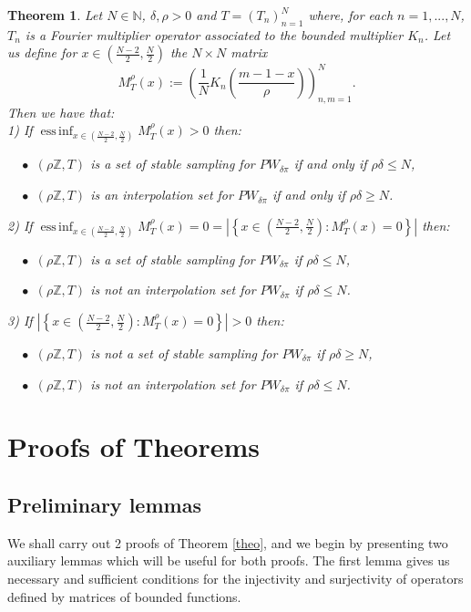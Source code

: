 \documentclass[reqno]{amsart}
\theoremstyle{plain}
\newtheorem{theorem}{Theorem}
\theoremstyle{definition}
\numberwithin{equation}{section}
\newcommand{\Z}{{\mathbb Z}}
\newcommand{\N}{{\mathbb N}}
\newcommand{\pa}[1]{\left(#1\right)}
\newcommand{\abs}[1]{\left\vert#1\right\vert}
\newcommand{\set}[2]{\left\{#1 :#2\right\}}
\DeclareMathOperator{\essinf}{ess\,inf}
\providecommand{\abs}[1]{ \lvert#1  \rvert}
\begin{document}
\begin{theorem} \label{theo2}
	Let $N\in\N$, $\delta,\rho>0$ and $T=\pa{T_n}_{n=1}^N$ where, for each $n=1,...,N$, $T_n$ is a Fourier multiplier operator associated to the bounded multiplier $K_n$. Let us define for $x\in\pa{\frac{N-2}{2},\frac{N}{2}}$ the $N\times N$ matrix
	$$M^\rho_T(x):=\pa{\frac{1}{N} K_n\pa{\frac{m-1-x}{\rho}}}_{n,m=1}^N.$$
	Then we have that: \\
	
	1) If $\essinf_{x\in\pa{\frac{N-2}{2},\frac{N}{2}}} M^\rho_T(x)>0$ then:
	
	$\quad \bullet$ $\pa{\rho\Z,T}$ is a set of stable sampling for $PW_{\delta\pi}$ if and only if $\rho\delta\leq N$,
	
	$\quad \bullet$ $\pa{\rho\Z,T}$ is an interpolation set for $PW_{\delta\pi}$ if and only if $\rho\delta\geq N$.
    	
	2) If $\essinf_{x\in\pa{\frac{N-2}{2},\frac{N}{2}}} M^\rho_T(x)=0=\abs{\set{x\in\pa{\frac{N-2}{2},\frac{N}{2}}}{M^\rho_T(x)=0}}$ then:

    $\quad \bullet$ $\pa{\rho\Z,T}$ is a set of stable sampling for $PW_{\delta\pi}$ if $\rho\delta\leq N$,
	
	$\quad \bullet$ $\pa{\rho\Z,T}$ is not an interpolation set for $PW_{\delta\pi}$ if $\rho\delta\leq N$. 
    
	3) If $\abs{\set{x\in\pa{\frac{N-2}{2},\frac{N}{2}}}{M^\rho_T(x)=0}}> 0$ then:

    $\quad \bullet$ $\pa{\rho\Z,T}$ is not a set of stable sampling for $PW_{\delta\pi}$ if $\rho\delta\geq N$, 
	
	$\quad \bullet$ $\pa{\rho\Z,T}$ is not an interpolation set for $PW_{\delta\pi}$ if $\rho\delta\leq N$. 
\end{theorem}


\section{Proofs of Theorems}

\subsection{Preliminary lemmas} We shall carry out 2 proofs of Theorem \ref{theo}, and we begin by presenting two auxiliary lemmas which will be useful for both proofs. The first lemma gives us necessary and sufficient conditions for the injectivity and surjectivity of operators defined by matrices of bounded functions.
\end{document}
